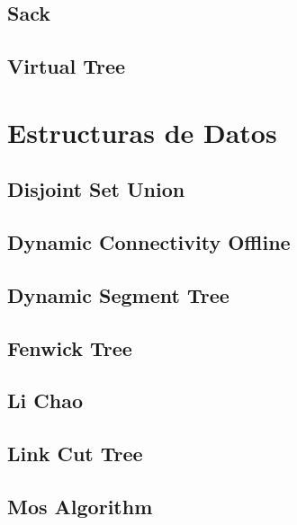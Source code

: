\subsection{Sack}
\raggedbottom
\hrulefill
\subsection{Virtual Tree}
\raggedbottom
\hrulefill

\section{Estructuras de Datos}
\subsection{Disjoint Set Union}
\raggedbottom
\hrulefill
\subsection{Dynamic Connectivity Offline}
\raggedbottom
\hrulefill
\subsection{Dynamic Segment Tree}
\raggedbottom
\hrulefill
\subsection{Fenwick Tree}
\raggedbottom
\hrulefill
\subsection{Li Chao}
\raggedbottom
\hrulefill
\subsection{Link Cut Tree}
\raggedbottom
\hrulefill
\subsection{Mos Algorithm}
\raggedbottom
\hrulefill

